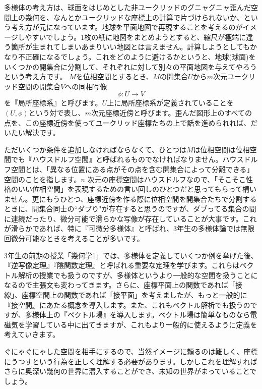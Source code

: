 多様体の考え方は、球面をはじめとした非ユークリッドのグニャグニャ歪んだ空間上の幾何を、なんとかユークリッドな座標上の計算で片づけられないか、という考え方が元になっています。地球を平面地図で再現することを考えるのがイメージしやすいでしょう。1枚の紙に地図をまとめようとすると、縮尺が極端に違う箇所が生まれてしまいあまりいい地図とは言えません。計算しようとしてもかなり不正確になるでしょう。これをどのように避けるかというと、地球(球面)をいくつかの開集合に分割して、それぞれに対して別々の平面地図を与えてやろうという考え方です。
$M$を位相空間とするとき、$M$の開集合$U$から$m$次元ユークリッド空間の開集合$V$への同相写像
\[
\phi : U \rightarrow V
\]
を『局所座標系』と呼びます。$U$上に局所座標系が定義されていることを$(U,\phi)$という対で表し、$m$次元座標近傍と呼びます。歪んだ図形上のすべての点を、この座標近傍を使ってユークリッド座標たちの上で話を進められれば、だいたい解決です。

ただいくつか条件を追加しなければならなくて、ひとつは$M$は位相空間は位相空間でも『ハウスドルフ空間』と呼ばれるものでなければなりません。ハウスドルフ空間とは、「異なる位置にある点がその点を含む開集合によって分離できる」空間のことを指します。$n$ 次元の座標空間はハウスドルフなので、「そこそこ性格のいい位相空間」を表現するための言い回しのひとつだと思ってもらって構いません。更にもうひとつ、座標近傍を作る際に位相空間を開集合たちで分割するときに、開集合同士の``ダブり"が存在すると思うのですが、ダブってる集合の間に連続だったり、微分可能で滑らかな写像が存在していることが大事です。これが滑らかであれば、特に『可微分多様体』と呼ばれ、3年生の多様体論では無限回微分可能なときを考えることが多いです。

3年生の前期の授業「幾何学1」では、多様体を定義していくつか例を挙げた後、『逆写像定理』『陰関数定理』と呼ばれる重要な定理を学びます。これらはベクトル解析の授業でも扱うのですが、多様体というより一般的な空間を扱うことになるので主張文も変わってきます。さらに、座標平面上の関数であれば「接線」、座標空間上の関数であれば「接平面」を考えましたが、もっと一般的に『接空間』にあたる概念を導入します。また、これもベクトル解析でも扱うのですが、多様体上の『ベクトル場』を導入します。ベクトル場は簡単なものなら電磁気を学習している中に出てきますが、これもより一般的に使えるように定義を考えていきます。

ぐにゃぐにゃした空間を相手にするので、当然イメージに頼るのは難しく、座標にうつすという行為を正しく理解する必要があります。しかしこれを理解すればさらに奥深い幾何の世界に潜入することができ、未知の世界がまっていることでしょう。

